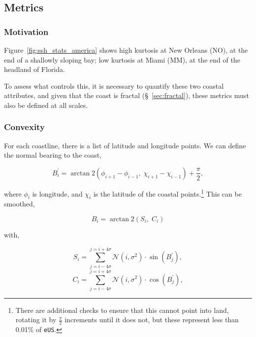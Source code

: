 

\subsection{Metrics}
\subsubsection{Motivation}
Figure~\ref{fig:ssh_stats_america} shows
high kurtosis at New Orleans (NO), at the end of a shallowly sloping bay;
low kurtosis at Miami (MM), at the end of the headland of Florida.

To assess what controls this,
it is necessary to quantify these two coastal attributes,
and given that the coast is fractal (§~\ref{sec:fractal}),
these metrics must also be defined at all scales.

\subsubsection{Convexity}
\label{sec:convexity}

For each coastline,
there is a list of latitude and longitude points.
We can define the normal bearing to the coast,

\begin{equation}
B_i^{\prime}=\operatorname{arctan} 2
\left(\phi_{i+1}-\phi_{i-1},\; \chi_{i+1}-\chi_{i-1}\right) +\frac{\pi}{2},
\label{eq:bearing}
\end{equation}

where $\phi_{i}$ is longitude, and $\chi_{i}$ is the latitude of the coastal points.\footnote{
There are additional checks to ensure that this cannot point into land,
rotating it by $\frac{\pi}{2}$ increments until it does not,
but these represent less than 0.01\% of \texttt{eUS}.}
This can be smoothed,

\begin{equation}
B_i=\operatorname{arctan} 2
\left(S_i,\; C_i\right)
\label{eq:bearing}
\end{equation}

with,

\begin{equation}
S_i = \sum_{j=i-4\sigma}^{j=i+4\sigma} \mathcal{N}(i, \sigma^{2})\cdot \sin{( B_{j}^{\prime})},
\end{equation}
\begin{equation}
C_i  =  \sum_{j=i-4\sigma}^{j=i+4\sigma} \mathcal{N}(i, \sigma^{2})\cdot  \cos{( B_{j}^{\prime})},
\end{equation}

